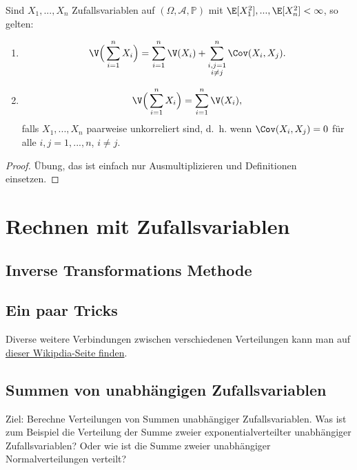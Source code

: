 \begin{satz}[Bienaymé]\label{bien}
 Sind $X_1,...,X_n$ Zufallsvariablen auf $(\Omega, \mathcal A, \mathbb P)$ mit $\E[X_1^2],...,\E[X_n^2] < \infty$, so gelten:
	\begin{enumerate}[label=(\roman*)]
		\item
		\[ \V\Big(\sum\limits_{i=1}^{n} X_i\Big) = \sum\limits_{i=1}^{n} \V(X_i) + \sum\limits_{\substack{i,j=1\\i \neq j}}^{n} \Cov(X_i,X_j).  \]
		\item \[ \V\Big(\sum\limits_{i=1}^{n} X_i\Big) = \sum\limits_{i=1}^{n} \V(X_i), \] falls $X_1,...,X_n$ paarweise unkorreliert sind, \mbox{d. h.} wenn $\Cov(X_i,X_j) = 0$ f\"ur alle $ i,j = 1,...,n$, $i\neq j$. 
	\end{enumerate}
\end{satz}

\begin{proof}
	Übung, das ist einfach nur Ausmultiplizieren und Definitionen einsetzen.
\end{proof}

\section{Rechnen mit Zufallsvariablen}

\subsection{Inverse Transformations Methode}

\subsection{Ein paar Tricks}


Diverse weitere Verbindungen zwischen verschiedenen Verteilungen kann man auf \hyperlink{https://en.wikipedia.org/wiki/Relationships_among_probability_distributions}{dieser Wikipdia-Seite finden}.


\subsection{Summen von unabhängigen Zufallsvariablen}
Ziel: Berechne Verteilungen von Summen unabhängiger Zufallsvariablen. Was ist zum Beispiel die Verteilung der Summe zweier exponentialverteilter unabh\"angiger Zufallsvariablen? Oder wie ist die Summe zweier unabh\"angiger Normalverteilungen verteilt?\smallskip

